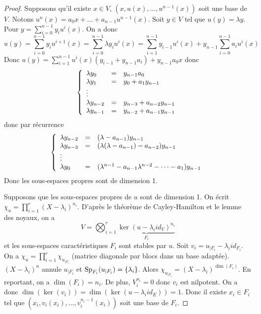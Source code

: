 \documentclass[12pt]{article}
\begin{document}
\begin{proof}
	Supposons qu'il existe $x\in V$, $(x,u(x),\dots,u^{n-1}(x))$ soit une base de $V$. Notons $u^{n}(x)=a_{0}x+\dots+a_{n-1}u^{n-1}(x)$. Soit $y\in V$ tel que $u(y)=\lambda y$. Pour $y=\sum_{i=0}^{n-1}y_{i}u^{i}(x)$. On a donc 
	\begin{equation}
		u(y)=\sum_{i=0}^{n-1}y_{i}u^{i+1}(x)=\sum_{i=0}^{n-1}\lambda y_{i}u^{i}(x)=\sum_{i=1}^{n-1}y_{i-1}u^{i}(x)+y_{n-1}\sum_{i=0}^{n-1}a_{i}u^{i}(x)
	\end{equation}
	Donc $u(y)=\sum_{i=1}^{n-1}u^{i}(x)(y_{i-1}+y_{n-1}a_{i})+y_{n-1}a_{0}x$ donc 
	\begin{equation}
		\left\lbrace
			\begin{array}[]{lll}
				\lambda y_{0} &= &y_{n-1}a_{0}\\
				\lambda y_{1} &= &y_{0}+a_{1}y_{n-1}\\
				\vdots\\
				\lambda y_{n-2} &= &y_{n-3}+a_{n-2}y_{n-1}\\
				\lambda y_{n-1} &= &y_{n-2}+a_{n-1}y_{n-1}
			\end{array}
		\right.
	\end{equation}
	donc par récurrence 
	\begin{equation}
		\left\lbrace
			\begin{array}[]{lll}
				\lambda y_{n-2} &= &(\lambda -a_{n-1})y_{n-1}\\
				\lambda y_{n-3} &= &(\lambda(\lambda-a_{n-1})-a_{n-2})y_{n-1}\\
				\vdots\\
				\lambda y_{0} &= &(\lambda^{n-1}-a_{n-1}\lambda^{n-2}-\dots-a_{1})y_{n-1}
			\end{array}
		\right.
	\end{equation}
	Donc les sous-espaces propres sont de dimension 1.

	Supposons que les sous-espaces propres de $u$ sont de dimension 1. On écrit $\chi_{u}=\prod_{i=1}^{r}(X-\lambda_{i})^{n_{i}}$. D'après le théorème de Cayley-Hamilton et le lemme des noyaux, on a 
	\begin{equation}
		V=\bigotimes_{i=1}^{r}\underbrace{\ker(u-\lambda_{i}id_{V})^{n_{i}}}_{F_{i}}
	\end{equation}
	et les sous-espaces caractéristiques $F_{i}$ sont stables par $u$. Soit $v_{i}=u_{\mid F_{i}}-\lambda_{i}id_{F_{i}}$. On a $\chi_{u}=\prod_{i=1}^{r}\chi_{u_{\mid F_{i}}}$ (matrice diagonale par blocs dans un base adaptée). $(X-\lambda_{i})^{n}$ annule $u_{\mid F_{i}}$ et $\operatorname{Sp}_{F_{i}}(u_{\mid F_{i}})=\lbrace\lambda_{i}\rbrace$. Alors $\chi_{u_{\mid F_{i}}}=(X-\lambda_{i})^{\dim(F_{i})}$. En reportant, on a $\dim(F_{i})=n_{i}$. De plus, $V_{i}^{n_i}=0$ donc $v_{i}$ est nilpotent. On a donc $\dim(\ker(v_{i}))=\dim(\ker(u-\lambda_{i}id_{E}))=1$. Donc il existe $x_{i}\in F_{i}$ tel que $(x_{i},v_{i}(x_{i}),\dots,v_{i}^{n_{i}-1}(x_{i}))$ soit une base de $F_{i}$.


\end{proof}
\end{document}
